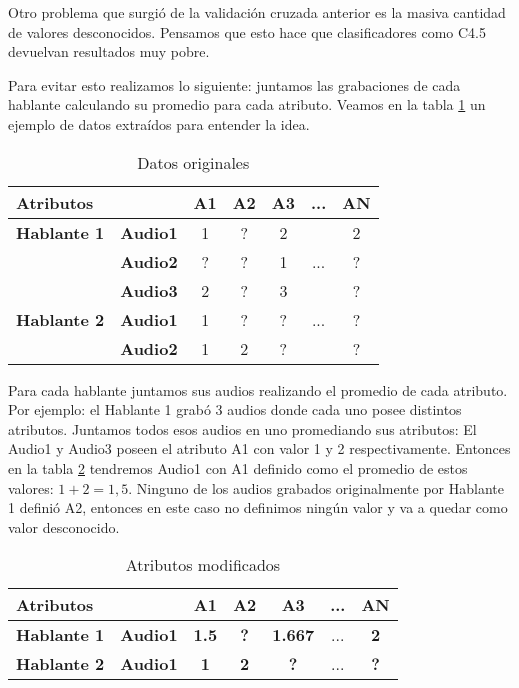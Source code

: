Otro problema que surgió de la validación cruzada anterior es la masiva cantidad de valores desconocidos. Pensamos que esto hace que clasificadores como C4.5 devuelvan resultados muy pobre. 

Para evitar esto realizamos lo siguiente: juntamos las grabaciones de cada hablante calculando su promedio para cada atributo. Veamos en la tabla \ref{datos_orig} un ejemplo de datos extraídos para entender la idea. 

\begin{table}[H]
	\centering
	\begin{tabular}{|l|l|ccccc|}
		\hline
		\multicolumn{2}{|l|}{Atributos} & A1 & A2 & A3 & ... & AN \\
		\hline 
		\textbf{Hablante 1} & \textbf{Audio1} & 1 & ? & 2 & & 2\\
		& \textbf{Audio2} & ? & ? & 1 & ... & ? \\
		& \textbf{Audio3} & 2 & ? & 3 & & ? \\
		\hline
		\textbf{Hablante 2} & \textbf{Audio1} & 1 & ? & ? & ... & ? \\
		& \textbf{Audio2} & 1 & 2 & ? & & ? \\
		\hline
	\end{tabular}
	\caption{Datos originales}
	\label{datos_orig}
\end{table}

Para cada hablante juntamos sus audios realizando el promedio de cada atributo. Por ejemplo: el Hablante 1 grabó 3 audios donde cada uno posee distintos atributos. Juntamos todos esos audios en uno promediando sus atributos: El Audio1 y Audio3 poseen el atributo A1 con valor 1 y 2 respectivamente. Entonces en la tabla \ref{PAH_datos_comb} tendremos Audio1 con A1 definido como el promedio de estos valores: $1 + 2 = 1,5$. Ninguno de los audios grabados originalmente por Hablante 1 definió A2, entonces en este caso no definimos ningún valor y va a quedar como valor desconocido. 

\begin{table}[H]
	\centering
	\begin{tabular}{|l|l|ccccc|}
		\hline
		\multicolumn{2}{|l|}{Atributos} & A1 & A2 & A3 & ... & AN \\
		\hline 
		\textbf{Hablante 1} & \textbf{Audio1} & \textbf{1.5} & \textbf{?} & \textbf{1.667} & ... & \textbf{2}\\
		\hline
		\textbf{Hablante 2} & \textbf{Audio1} & \textbf{1} & \textbf{2} & \textbf{?} & ... & \textbf{?} \\
		\hline
	\end{tabular}
	\caption{Atributos modificados}
	\label{PAH_datos_comb}
\end{table}

